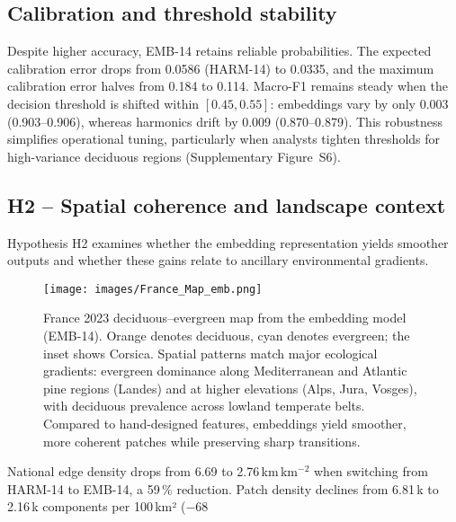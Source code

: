 \documentclass[utf8]{FrontiersinHarvard}
\begin{document}
\subsection{Calibration and threshold stability}

Despite higher accuracy, EMB-14 retains reliable probabilities. The expected calibration error drops from 0.0586 (HARM-14) to 0.0335, and the maximum calibration error halves from 0.184 to 0.114. Macro-F1 remains steady when the decision threshold is shifted within \([0.45,0.55]\): embeddings vary by only 0.003 (0.903–0.906), whereas harmonics drift by 0.009 (0.870–0.879). This robustness simplifies operational tuning, particularly when analysts tighten thresholds for high-variance deciduous regions (Supplementary Figure~S6).

\subsection{H2 -- Spatial coherence and landscape context}
Hypothesis H2 examines whether the embedding representation yields smoother outputs and whether these gains relate to ancillary environmental gradients.

\begin{figure}[H]
    \centering
    \texttt{[image: images/France\_Map\_emb.png]}
    \caption{France 2023 deciduous--evergreen map from the embedding model (EMB-14). Orange denotes deciduous, cyan denotes evergreen; the inset shows Corsica. Spatial patterns match major ecological gradients: evergreen dominance along Mediterranean and Atlantic pine regions (Landes) and at higher elevations (Alps, Jura, Vosges), with deciduous prevalence across lowland temperate belts. Compared to hand-designed features, embeddings yield smoother, more coherent patches while preserving sharp transitions.}
    \label{fig:national_map}
\end{figure}

National edge density drops from 6.69 to 2.76\,km\,km\(^{-2}\) when switching from HARM-14 to EMB-14, a 59\,\% reduction. Patch density declines from 6.81\,k to 2.16\,k components per 100\,km² (−68\,%
\end{document}
